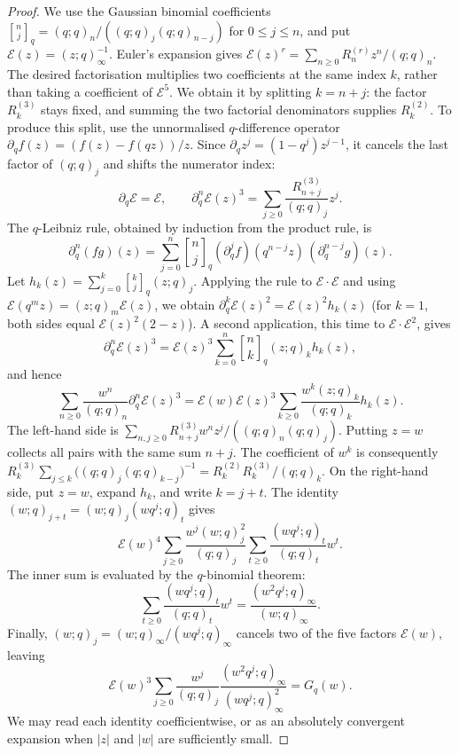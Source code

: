 \documentclass[11pt]{article}
\begin{document}
\begin{proof}
We use the Gaussian binomial coefficients
$\genfrac{[}{]}{0pt}{}{n}{j}_q=(q;q)_n/((q;q)_j(q;q)_{n-j})$ for
$0\le j\le n$, and put $\mathcal E(z)=(z;q)_\infty^{-1}$.
Euler's expansion gives
$\mathcal E(z)^r=\sum_{n\ge0}R_n^{(r)}z^n/(q;q)_n$.
The desired factorisation multiplies two coefficients at the same
index $k$, rather than taking a coefficient of $\mathcal E^5$.
We obtain it by splitting $k=n+j$: the factor $R_k^{(3)}$ stays
fixed, and summing the two factorial denominators supplies
$R_k^{(2)}$. To produce this split, use the unnormalised
$q$-difference operator $\partial_qf(z)=(f(z)-f(qz))/z$.
Since $\partial_qz^j=(1-q^j)z^{j-1}$, it cancels the last factor
of $(q;q)_j$ and shifts the numerator index:
\[
 \partial_q\mathcal E=\mathcal E,\qquad
 \partial_q^n\mathcal E(z)^3
 =\sum_{j\ge0}\frac{R_{n+j}^{(3)}}{(q;q)_j}z^j.
\]
The $q$-Leibniz rule, obtained by induction from the product rule, is
\[
 \partial_q^n(fg)(z)=\sum_{j=0}^n\genfrac{[}{]}{0pt}{}{n}{j}_q
 (\partial_q^jf)(q^{n-j}z)\,(\partial_q^{n-j}g)(z).
\]
Let $h_k(z)=\sum_{j=0}^k\genfrac{[}{]}{0pt}{}{k}{j}_q(z;q)_j$.
Applying the rule to $\mathcal E\cdot\mathcal E$ and using
$\mathcal E(q^mz)=(z;q)_m\mathcal E(z)$, we obtain
$\partial_q^k\mathcal E(z)^2=\mathcal E(z)^2h_k(z)$
(for $k=1$, both sides equal $\mathcal E(z)^2(2-z)$).
A second application, this time to $\mathcal E\cdot\mathcal E^2$, gives
\[
 \partial_q^n\mathcal E(z)^3
 =\mathcal E(z)^3\sum_{k=0}^n\genfrac{[}{]}{0pt}{}{n}{k}_q(z;q)_kh_k(z),
\]
and hence
\[
 \sum_{n\ge0}\frac{w^n}{(q;q)_n}\partial_q^n\mathcal E(z)^3
 =\mathcal E(w)\mathcal E(z)^3
  \sum_{k\ge0}\frac{w^k(z;q)_k}{(q;q)_k}h_k(z).
\]
The left-hand side is
$\sum_{n,j\ge0}R_{n+j}^{(3)}w^nz^j/((q;q)_n(q;q)_j)$.
Putting $z=w$ collects all pairs with the same sum $n+j$.
The coefficient of $w^k$ is consequently
$R_k^{(3)}\sum_{j\le k}\bigl((q;q)_j(q;q)_{k-j}\bigr)^{-1}
=R_k^{(2)}R_k^{(3)}/(q;q)_k$.
On the right-hand side, put $z=w$, expand $h_k$, and write
$k=j+t$. The identity $(w;q)_{j+t}=(w;q)_j(wq^j;q)_t$ gives
\[
 \mathcal E(w)^4\sum_{j\ge0}\frac{w^j(w;q)_j^2}{(q;q)_j}
       \sum_{t\ge0}\frac{(wq^j;q)_t}{(q;q)_t}w^t.
\]
The inner sum is evaluated by the $q$-binomial theorem:
\[
 \sum_{t\ge0}\frac{(wq^j;q)_t}{(q;q)_t}w^t
 =\frac{(w^2q^j;q)_\infty}{(w;q)_\infty}.
\]
Finally, $(w;q)_j=(w;q)_\infty/(wq^j;q)_\infty$ cancels two
of the five factors $\mathcal E(w)$, leaving
\[
 \mathcal E(w)^3\sum_{j\ge0}\frac{w^j}{(q;q)_j}
       \frac{(w^2q^j;q)_\infty}{(wq^j;q)_\infty^2}
 =G_q(w).
\]
We may read each identity coefficientwise, or as an absolutely
convergent expansion when $|z|$ and $|w|$ are sufficiently small.


\end{proof}
\end{document}
